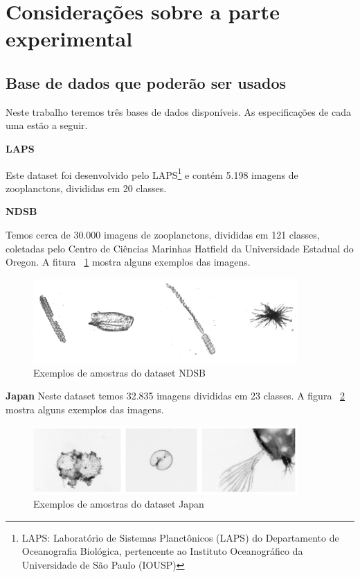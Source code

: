 \section{Considerações sobre a parte experimental}
\label{sec:consideracoes_parte_experimental}


\subsection{Base de dados que poderão ser usados} 
\label{sec:base_usadas}

Neste trabalho teremos três bases de dados disponíveis. As especificações de cada uma estão a seguir.

\textbf{LAPS}

Este dataset foi desenvolvido pelo LAPS\footnote{LAPS: Laboratório de Sistemas Planctônicos (LAPS) do Departamento de Oceanografia Biológica, pertencente ao Instituto Oceanográfico da Universidade de São Paulo (IOUSP)} e contém 5.198 imagens de zooplanctons, divididas em 20 classes.

\textbf{NDSB}

Temos cerca de 30.000 imagens de zooplanctons, divididas em 121 classes, coletadas pelo Centro de Ciências Marinhas Hatfield da Universidade Estadual do Oregon. A fitura ~\ref{fig:ndsb} mostra alguns exemplos das imagens.

\begin{figure}
  \centering
  \includegraphics[width=0.9\textwidth]{figures/ndsb_exemplos.png}
  \caption{Exemplos de amostras do dataset NDSB}
  \label{fig:ndsb}
\end{figure}

\textbf{Japan}
Neste dataset temos 32.835 imagens divididas em 23 classes. A figura ~\ref{fig:japan} mostra alguns exemplos das imagens.


\begin{figure}
  \centering
  \includegraphics[width=0.9\textwidth]{figures/japan_exemplos.png}
  \caption{Exemplos de amostras do dataset Japan}
  \label{fig:japan}
\end{figure}







